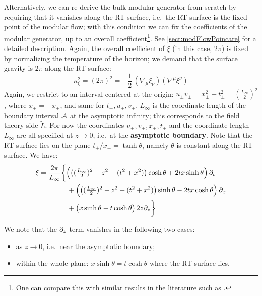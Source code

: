 \documentclass[11pt,a4paper]{article}
\begin{document}
	Alternatively, we can re-derive the bulk modular generator from scratch by requiring that it vanishes along the RT surface, i.e.~the RT surface is the fixed point of the modular flow; with this condition we can fix the coefficients of the modular generator, up to an overall coefficient\footnote{
		One can compare this with similar results in the literature such as \cite{Lashkari:2016idm,Czech:2019vih,Apolo:2020qjm}. 
	}. See \autoref{sect:modFlowPoincare} for a detailed description. 
	Again, the overall coefficient of $\xi$ (in this case, $2\pi$) is fixed by normalizing the temperature of the horizon; we demand that the surface gravity is $2\pi$ along the RT surface:
	\begin{equation}
		\kappa_\xi^2
		= (2\pi)^2
		= -\frac{1}{2}\,
			(\nabla_{\mu} \xi_{\nu})
			(\nabla^{\mu} \xi^{\nu})
	\end{equation}
	Again, we restrict to an interval centered at the origin: $
		u_\pm v_\pm
		= x^2_\pm - t^2_\pm
		= (\frac{L_\infty}{2})^2
	$, where $x_\pm = -x_\mp$, and same for $t_\pm, u_\pm, v_\pm$. 
	$L_\infty$ is the coordinate length of the boundary interval $\mathcal{A}$ at the asymptotic infinity; this corresponds to the field theory side ${\tilde L}$. 
	For now the coordinates $u_\pm, v_\pm, x_\pm, t_\pm$ and the coordinate length $L_\infty$ are all specified at $z\to 0$, i.e.~at the \textbf{asymptotic boundary}. Note that the RT surface lies on the plane $
		t_\pm / x_\pm = \tanh \theta
	$, namely $\theta$ is constant along the RT surface. 
	We have:
	\begin{gather}
	\begin{aligned}
		\xi &= \frac{2\pi}{L_\infty} \bigg\{
			\pqty\Big{
				\pqty{
					(\tfrac{L_\infty}{2})^2 - z^2
					- (t^2 + x^2)
				} \cosh\theta
				+ 2tx \sinh\theta
			} \,\pdd{t}
		\\ &\qquad\qquad 
			+ \pqty\Big{
				\pqty{
					(\tfrac{L_\infty}{2})^2 - z^2
					+ (t^2 + x^2)
				} \sinh\theta
				- 2tx \cosh\theta
			} \,\pdd{x}
		\\ &\qquad\qquad 
			+ \pqty\big{
				x\sinh\theta
				- t\cosh\theta
			} \,2z\pdd{z}
		\bigg\}
	\end{aligned}
	\end{gather}
	
	We note that the $\partial_{z}$ term vanishes in the following two cases:
	\begin{itemize}[noitemsep,topsep=0pt]
	\item as $z\to 0$, i.e.~near the asymptotic boundary;
	\item within the whole plane: $
			x\sinh\theta
			= t\cosh\theta
		$ where the RT surface lies. 
	\end{itemize}
	
\end{document}

